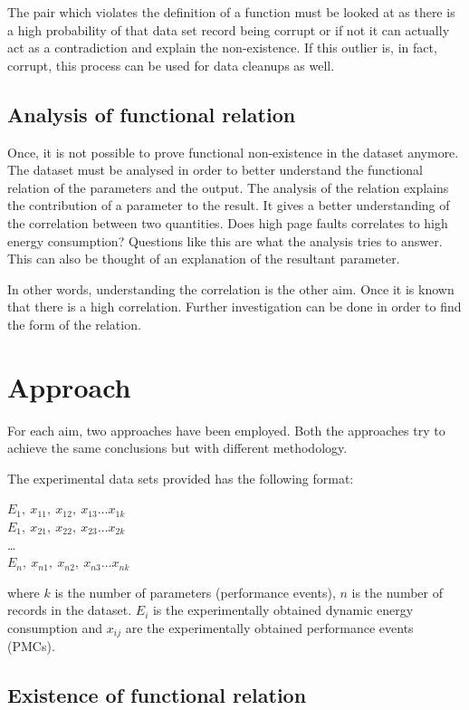 The pair which violates the definition of a function must be looked at as there is a high probability of that data set record being corrupt or if not it can actually act as a contradiction and explain the non-existence. If this outlier is, in fact, corrupt, this process can be used for data cleanups as well.

\subsection{Analysis of functional relation}

Once, it is not possible to prove functional non-existence in the dataset anymore. The dataset must be analysed in order to better understand the functional relation of the parameters and the output. The analysis of the relation explains the contribution of a parameter to the result. It gives a better understanding of the correlation between two quantities. Does high page faults correlates to high energy consumption? Questions like this are what the analysis tries to answer. This can also be thought of an explanation of the resultant parameter.

In other words, understanding the correlation is the other aim. Once it is known that there is a high correlation. Further investigation can be done in order to find the form of the relation.

\section{Approach}

For each aim, two approaches have been employed. Both the approaches try to achieve the same conclusions but with different methodology.

The experimental data sets provided has the following format:

\(E_1,\ x_{11},\ x_{12},\ x_{13} \ldots x_{1k}\)\\
\(E_1,\ x_{21},\ x_{22},\ x_{23} \ldots x_{2k}\)\\
\ldots \\
\(E_n,\ x_{n1},\ x_{n2},\ x_{n3} \ldots x_{nk}\)

where \(k\) is the number of parameters (performance events), \(n\) is the number of records in the dataset.
\(E_i\) is the experimentally obtained dynamic energy consumption and \(x_{ij}\) are the experimentally obtained performance events (PMCs).

\subsection{Existence of functional relation}

